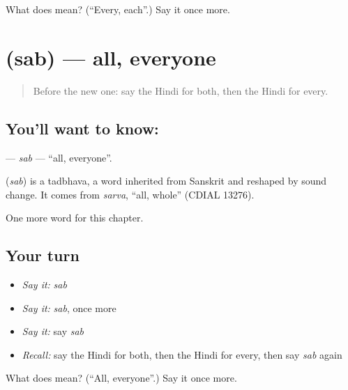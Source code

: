 \begin{tcolorbox}[breakable,colback=teal!4,colframe=teal!35!black,title={Before you move on}]
What does  mean? (\textquotedblleft{}Every, each\textquotedblright{}.) Say it once more.
\end{tcolorbox}
\section[\texorpdfstring{\hi{सब} (sab)}{सब (sab)}]{ (sab) — all, everyone}

\label{lesson:HI-C245-sab}



\begin{quote}
Before the new one: say the Hindi for both, then the Hindi for every.
\end{quote}

\subsection*{You'll want to know: }
\textbf{} — \emph{sab} — \textquotedblleft{}all, everyone\textquotedblright{}.

\begin{cousinweb}
\textbf{} (\emph{sab}) is a tadbhava, a word inherited from Sanskrit and reshaped by sound change. It comes from \emph{sarva}, \textquotedblleft{}all, whole\textquotedblright{} (CDIAL 13276).
\end{cousinweb}

\begin{grammarlens}[title={What you've built}]
One more word for this chapter.
\end{grammarlens}

\subsection*{Your turn}
\begin{itemize}
\raggedright
  \item \emph{Say it:} \emph{sab}
  \item \emph{Say it:} \emph{sab}, once more
  \item \emph{Say it:} say \emph{sab}
  \item \emph{Recall:} say the Hindi for both, then the Hindi for every, then say \emph{sab} again
\end{itemize}

\begin{tcolorbox}[breakable,colback=teal!4,colframe=teal!35!black,title={Before you move on}]
What does  mean? (\textquotedblleft{}All, everyone\textquotedblright{}.) Say it once more.
\end{tcolorbox}
